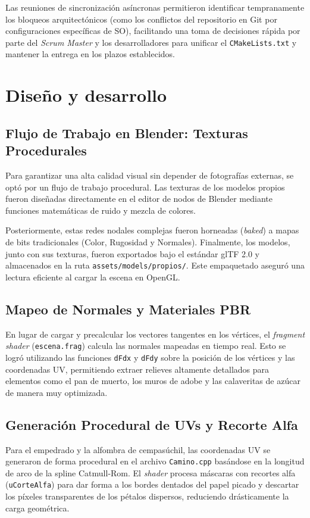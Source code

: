 \documentclass[letter,11pt]{article}
\begin{document}
	Las reuniones de sincronización asíncronas permitieron identificar tempranamente los bloqueos arquitectónicos (como los conflictos del repositorio en Git por configuraciones específicas de SO), facilitando una toma de decisiones rápida por parte del \textit{Scrum Master} y los desarrolladores para unificar el \texttt{CMakeLists.txt} y mantener la entrega en los plazos establecidos.
	
	\section{Diseño y desarrollo}
	
	\subsection{Flujo de Trabajo en Blender: Texturas Procedurales}
	Para garantizar una alta calidad visual sin depender de fotografías externas, se optó por un flujo de trabajo procedural. Las texturas de los modelos propios fueron diseñadas directamente en el editor de nodos de Blender mediante funciones matemáticas de ruido y mezcla de colores.
	
	Posteriormente, estas redes nodales complejas fueron horneadas (\textit{baked}) a mapas de bits tradicionales (Color, Rugosidad y Normales). Finalmente, los modelos, junto con sus texturas, fueron exportados bajo el estándar glTF 2.0 y almacenados en la ruta \texttt{assets/models/propios/}. Este empaquetado aseguró una lectura eficiente al cargar la escena en OpenGL.
	
	\subsection{Mapeo de Normales y Materiales PBR}
	En lugar de cargar y precalcular los vectores tangentes en los vértices, el \textit{fragment shader} (\texttt{escena.frag}) calcula las normales mapeadas en tiempo real. Esto se logró utilizando las funciones \texttt{dFdx} y \texttt{dFdy} sobre la posición de los vértices y las coordenadas UV, permitiendo extraer relieves altamente detallados para elementos como el pan de muerto, los muros de adobe y las calaveritas de azúcar de manera muy optimizada.
	
	\subsection{Generación Procedural de UVs y Recorte Alfa}
	Para el empedrado y la alfombra de cempasúchil, las coordenadas UV se generaron de forma procedural en el archivo \texttt{Camino.cpp} basándose en la longitud de arco de la spline Catmull-Rom. El \textit{shader} procesa máscaras con recortes alfa (\texttt{uCorteAlfa}) para dar forma a los bordes dentados del papel picado y descartar los píxeles transparentes de los pétalos dispersos, reduciendo drásticamente la carga geométrica.
	
\end{document}
